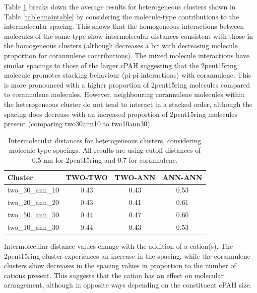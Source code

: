 Table \ref{table:mixedintermolecdists} breaks down the average results for heterogeneous clusters shown in Table \ref{table:maintable} by considering the molecule-type contributions to the intermolecular spacing. %
This shows that the homogeneous interactions between molecules of the same type show intermolecular distances consistent with those in the homogeneous clusters (although decreases a bit with decreasing molecule proportion for corannulene contributions). The mixed molecule interactions have similar spacings to those of the larger cPAH suggesting that the 2pent15ring molecule promotes stacking behaviour (pi-pi interactions) with corannulene.  This is more pronounced with a higher proportion of 2pent15ring molecules compared to corannulene molecules. 
However, neighbouring corannulene molecules within the heterogeneous cluster do not tend to interact in a stacked order, although the spacing does decrease with an increased proportion of 2pent15ring molecules present (comparing two30ann10 to two10ann30). %
%
\begin{table}[]
\centering
\caption{Intermolecular distances for heterogeneous clusters, considering molecule type spacings. All results are using cutoff distances of 0.5 nm for 2pent15ring and 0.7 for corannulene.}
\label{table:mixedintermolecdists}
\begin{tabular}{lccc}
\hline
Cluster & TWO-TWO & TWO-ANN & ANN-ANN \\ \hline
two\_30\_ann\_10 & 0.43 & 0.43 & 0.53 \\
two\_20\_ann\_20 & 0.43 & 0.41 & 0.61 \\
two\_50\_ann\_50 & 0.44 & 0.47 & 0.60 \\
two\_10\_ann\_30 & 0.44 & 0.43 & 0.53 \\ \hline
\end{tabular}
\end{table}
%

Intermolecular distance values change with the addition of a cation(s). The 2pent15ring cluster experiences an increase in the spacing, while the corannulene clusters show decreases in the spacing values in proportion to the number of cations present. This suggests that the cation has an effect on molecular arrangement, although in opposite ways depending on the constituent cPAH size.

